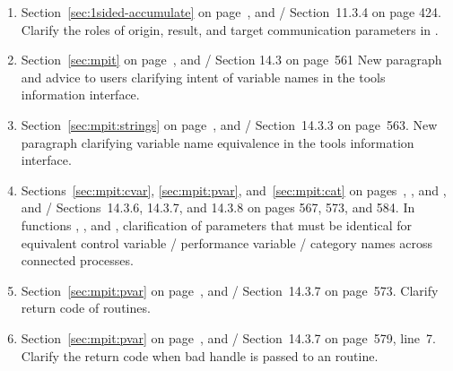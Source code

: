 \begin{enumerate}
\item 
Section~\ref{sec:1sided-accumulate} on page~\pageref{sec:1sided-accumulate}, and
\MPIIIIDOTO/ Section~11.3.4 on page 424.
\newline 
Clarify the roles of origin, result, and target communication parameters in . 

\item 
Section~\ref{sec:mpit} on page~\pageref{sec:mpit}, and
\MPIIIIDOTO/ Section 14.3 on page~561
\newline 
New paragraph and advice to users clarifying intent of variable names in the tools information interface.

\item 
Section~\ref{sec:mpit:strings} on page~\pageref{sec:mpit:strings}, and
\MPIIIIDOTO/ Section~14.3.3 on page~563.
\newline 
New paragraph clarifying variable name equivalence in the tools information interface.

\item 
Sections~\ref{sec:mpit:cvar}, \ref{sec:mpit:pvar}, and~\ref{sec:mpit:cat} on pages~\pageref{sec:mpit:cvar}, \pageref{sec:mpit:pvar}, and \pageref{sec:mpit:cat}, and
\newline 
\MPIIIIDOTO/ Sections~14.3.6, 14.3.7, and 14.3.8 on pages 567, 573, and 584.
\newline 
In functions , , and , clarification of parameters that must be identical for equivalent control variable / performance variable / category names across connected processes.

\item 
Section~\ref{sec:mpit:pvar} on page~\pageref{sec:mpit:pvar}, and
\MPIIIIDOTO/ Section~14.3.7 on page~573.
\newline 
Clarify return code 
%
%
%
of  routines. 

\item 
Section~\ref{sec:mpit:pvar} on page~\pageref{sec:mpit:pvar}, and
\MPIIIIDOTO/ Section~14.3.7 on page~579, line~7.
\newline 
Clarify the return code when bad handle is passed to 
%
%
%
%
%
%
%
an  routine. 


\end{enumerate}
